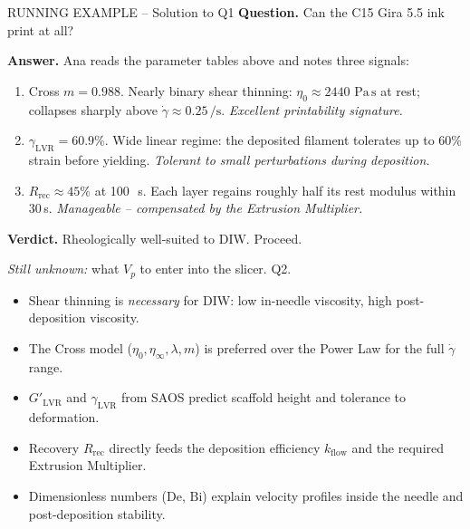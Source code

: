 \documentclass[11pt,a4paper]{article}
\newcommand{\gd}{\dot{\gamma}}
\newcommand{\Pas}{\,\mathrm{Pa\,s}}
\newcommand{\Bi}{\mathrm{Bi}}
\newcommand{\De}{\mathrm{De}}
\begin{document}
\begin{runningbox}{RUNNING EXAMPLE -- Solution to Q1}
\textbf{Question.} Can the C15 Gira 5.5 ink print at all?

\medskip\textbf{Answer.} Ana reads the parameter tables above and notes
three signals:
\begin{enumerate}[leftmargin=1.6em,itemsep=2pt]
\item Cross $m=0.988$. Nearly binary shear thinning: $\eta_0\approx
  2440\,\Pas$ at rest; collapses sharply above $\gd\approx
  0.25\,\si{\per\s}$. \emph{Excellent printability signature.}
\item $\gamma_\mathrm{LVR}=60.9\%$. Wide linear regime: the deposited
  filament tolerates up to 60\% strain before yielding. \emph{Tolerant
  to small perturbations during deposition.}
\item $R_\mathrm{rec}\approx 45\%$ at 100\,\si{\per\s}. Each layer
  regains roughly half its rest modulus within 30\,\si{\s}.
  \emph{Manageable -- compensated by the Extrusion Multiplier.}
\end{enumerate}
\textbf{Verdict.} Rheologically well-suited to DIW. Proceed.

\medskip\emph{Still unknown:} what $V_p$ to enter into the slicer. Q2.
\end{runningbox}

\begin{takeawaybox}
\begin{itemize}[leftmargin=1.4em,itemsep=2pt]
\item Shear thinning is \emph{necessary} for DIW: low in-needle viscosity,
  high post-deposition viscosity.
\item The Cross model ($\eta_0, \eta_\infty, \lambda, m$) is preferred
  over the Power Law for the full $\gd$ range.
\item $G'_\mathrm{LVR}$ and $\gamma_\mathrm{LVR}$ from SAOS predict
  scaffold height and tolerance to deformation.
\item Recovery $R_\mathrm{rec}$ directly feeds the deposition efficiency
  $k_\mathrm{flow}$ and the required Extrusion Multiplier.
\item Dimensionless numbers ($\De$, $\Bi$) explain velocity profiles
  inside the needle and post-deposition stability.
\end{itemize}
\end{takeawaybox}
\end{document}
